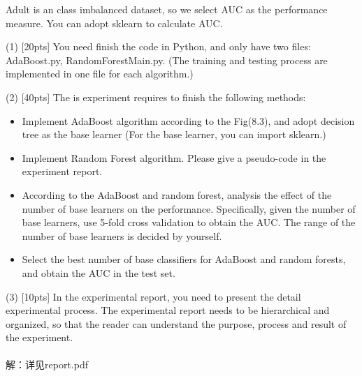 \documentclass{article}
\begin{document}
	Adult is an class imbalanced dataset, so we select AUC as the performance measure. You can adopt sklearn to calculate AUC.
	
(1) [20pts] You need finish the code in Python, and only have two files: AdaBoost.py, RandomForestMain.py. (The training and testing process are implemented in one file for each algorithm.)

(2) [40pts] The is experiment requires to finish the following methods:
	
		\begin{itemize}
			\item Implement AdaBoost algorithm according to the Fig(8.3), and adopt decision tree as the base learner (For the base learner, you can import sklearn.)
			\item  Implement Random Forest algorithm. Please give a pseudo-code in the experiment report.
			\item According to the AdaBoost and random forest, analysis the effect of the number of base learners on the performance. Specifically, given the number of base learners, use 5-fold cross validation to obtain the AUC. The range of the number of base learners is decided by yourself.
			\item Select the best number of base classifiers for AdaBoost and random forests, and obtain the AUC in the test set.
		\end{itemize}

(3) [10pts] In the experimental report, you need to present the detail experimental process. The experimental report needs to be hierarchical and organized, so that the reader can understand the purpose, process and result of the experiment.\\
\\解：详见report.pdf


		
\end{document}
